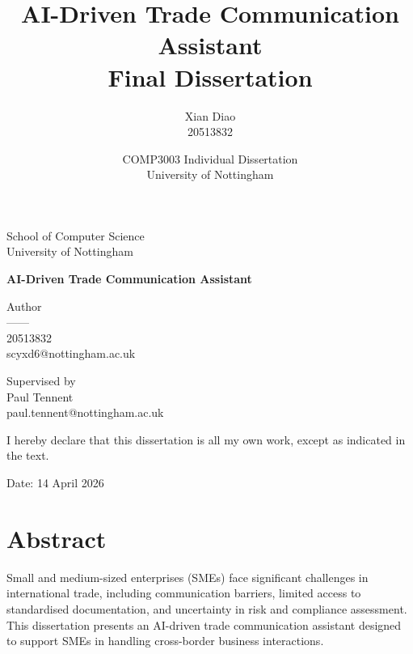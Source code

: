 \documentclass[12pt,a4paper]{report}
\title{\textbf{AI-Driven Trade Communication Assistant}\\[0.5em]
\large Final Dissertation}
\author{Xian Diao \\ 20513832}
\date{COMP3003 Individual Dissertation \\ University of Nottingham}
\begin{document}
\begin{titlepage}
\centering

{\LARGE School of Computer Science\\
University of Nottingham\par}

\vspace{2.5cm}

{\Huge \textbf{AI-Driven Trade Communication Assistant}\par}

\vspace{2.5cm}

{\large Author\\
——\\
20513832\\
scyxd6@nottingham.ac.uk\\
\par}

\vspace{2cm}

{\large Supervised by\\
Paul Tennent\\
paul.tennent@nottingham.ac.uk\par}

\vspace{2cm}

{\large I hereby declare that this dissertation is all my own work, except as indicated in the text.\par}

\vspace{1.5cm}

{\large Date: 14 April 2026\par}

\vfill

\end{titlepage}

\cleardoublepage
{}

\chapter*{Abstract}

Small and medium-sized enterprises (SMEs) face significant challenges in international trade, including communication barriers, limited access to standardised documentation, and uncertainty in risk and compliance assessment. This dissertation presents an AI-driven trade communication assistant designed to support SMEs in handling cross-border business interactions.
\end{document}
